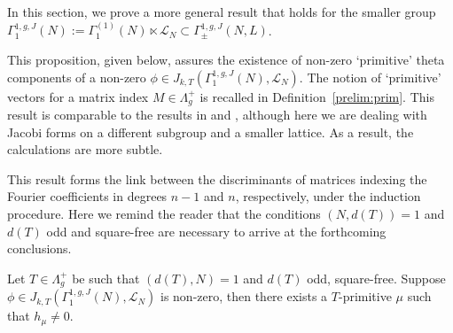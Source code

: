 \documentclass[11pt]{amsart}
\numberwithin{equation}{section}
\newcommand{\mc}{\mathcal}
\begin{document}
In this section, we prove a more general result that holds for the smaller group $\Gamma_1^{1,g,J}(N):= \Gamma_1^{(1)}(N)\ltimes \mc L_N \subset \Gamma_\pm^{1,g,J}(N, L)$. 

This proposition, given below, assures the existence of non-zero `primitive' theta components of a non-zero $\phi\in J_{k,T}(\Gamma_1^{1,g,J}(N), \mc L_N)$. The notion of `primitive' vectors for a matrix index $M \in \Lambda_g^+$ is recalled in Definition~\ref{prelim:prim}. This result is comparable to the results in \cite[Proposition 3.5]{boche-das} and \cite[Theorem 1]{anamby2024non}, although here we are dealing with Jacobi forms on a different subgroup and a smaller lattice. As a result, the calculations are more subtle.

This result forms the link between the discriminants of matrices indexing the Fourier coefficients in degrees $n-1$ and $n$, respectively, under the induction procedure. Here we remind the reader that the conditions $(N, d(T))=1$ and $d(T)$ odd and square-free are necessary to arrive at the forthcoming conclusions.

\begin{proposition}\label{prop:thetacom}
    Let $T\in \Lambda^+_g$ be such that  $(d(T), N)=1$ and $d(T)$ odd, square-free. Suppose $\phi\in J_{k, T}(\Gamma_1^{1,g, J}(N), \mc L_N)$ is non-zero, then there exists a $T$-primitive $\mu $ such that $h_{\mu}\neq 0$.
\end{proposition}
\end{document}
